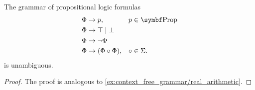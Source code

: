 \begin{proposition}\label{thm:propositional_formulas_are_unambiguous}
  The grammar of propositional logic formulas
  \begin{displaymath}
    \begin{aligned}
      &\Phi \to p,                 &&p \in \Cat{Prop} \\
      &\Phi \to \top \;|\; \bot    && \\
      &\Phi \to \neg \Phi          && \\
      &\Phi \to (\Phi \circ \Phi), &&\circ \in \Sigma.
    \end{aligned}
  \end{displaymath}
  is unambiguous.
\end{proposition}
\begin{proof}
  The proof is analogous to \cref{ex:context_free_grammar/real_arithmetic}.
\end{proof}

